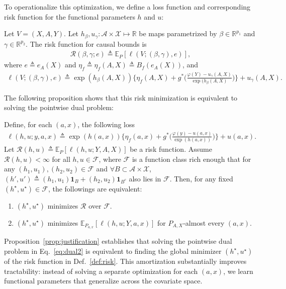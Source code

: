 To operationalize this optimization, we define a loss function and corresponding risk function for the functional parameters $h$ and $u$:
\begin{definition}\label{def:risk}
    \normalfont
    Let $V = (X,A,Y)$. Let $h_{\beta}, u_{\gamma}: \mathcal{A} \times \mathcal{X} \mapsto \mathbb{R}$ be maps parametrized by $\beta \in \mathbb{R}^{p_1}$ and $\gamma \in \mathbb{R}^{p_2}$. 
    The risk function for causal bounds is 
    \begin{align}\label{eq:risk}
        \mathcal{R}(\beta,\gamma; e) \triangleq \mathbb{E}_{P}[\ell(V; (\beta, \gamma), e )],
    \end{align}
    where $e \triangleq e_A(X)$ and $\eta_f \triangleq \eta_f(A,X) \triangleq B_f(e_A(X))$, and 
    \begin{align}\label{eq:loss}
        \ell(V; (\beta, \gamma), e ) \triangleq \exp(h_{\beta}(A,X))\Big\{\eta_f(A,X) + g^{\ast}\Big( \tfrac{\varphi(Y) - u_{\gamma}(A,X)}{\exp(h_{\beta}(A,X)}\Big) \Big\}  + u_{\gamma}(A,X).
    \end{align}
\end{definition}
The following proposition shows that this risk minimization is equivalent to solving the pointwise dual problem:
\begin{proposition}\label{prop:justification}
    \normalfont
    Define, for each $(a,x)$, the following loss
    \begin{align}
        \ell(h, u; y,a,x) \triangleq \exp(h(a,x))\Big\{\eta_f(a,x) + g^{\ast}\big( \tfrac{\varphi(y) - u(a,x)}{\exp(h(a,x))}\big) \Big\}  + u(a,x). 
    \end{align}
    Let $\mathcal{R}(h,u) \triangleq \mathbb{E}_{P}[\ell(h, u; Y,A,X)]$ be a risk function. Assume $\mathcal{R}(h,u) < \infty$ for all $h,u \in \mathcal{F}$, where $\mathcal{F}$ is a function class rich enough that for any $(h_1,u_1), (h_2,u_2) \in \mathcal{F}$ and $\forall B \subset \mathcal{A} \times \mathcal{X}$, $(h',u') \triangleq (h_1,u_1)\boldsymbol{1}_{B} + (h_2,u_2)\boldsymbol{1}_{B^c}$ also lies in $\mathcal{F}$. Then, for any fixed $(h^{\star}, u^{\star}) \in \mathcal{F}$, the followings are equivalent:
    \begin{enumerate}[leftmargin=*]
        \item $(h^{\star}, u^{\star})$ minimizes $\mathcal{R}$ over $\mathcal{F}$.
        \item $(h^{\star}, u^{\star})$ minimizes $\mathbb{E}_{P_{a,x}}[\ell(h,u;Y,a,x)]$ for $P_{A,X}$-almost every $(a,x)$. 
    \end{enumerate}
\end{proposition}
Proposition~\ref{prop:justification} establishes that solving the pointwise dual problem in Eq.~\eqref{eq:dual2} is equivalent to finding the global minimizer $(h^{\star}, u^{\star})$ of the risk function in Def.~\ref{def:risk}. This amortization substantially improves tractability: instead of solving a separate optimization for each $(a,x)$, we learn functional parameters that generalize across the covariate space.

